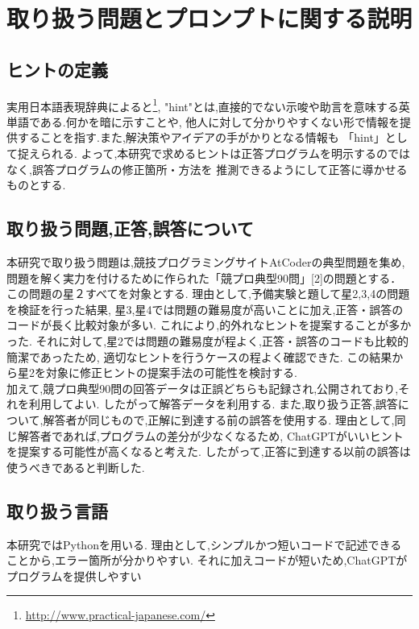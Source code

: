 \chapter{取り扱う問題とプロンプトに関する説明}

\section{ヒントの定義}
実用日本語表現辞典によると\footnote{\url{http://www.practical-japanese.com/}},
"hint"とは,直接的でない示唆や助言を意味する英単語である.何かを暗に示すことや,
他人に対して分かりやすくない形で情報を提供することを指す.また,解決策やアイデアの手がかりとなる情報も
「hint」として捉えられる.
よって,本研究で求めるヒントは正答プログラムを明示するのではなく,誤答プログラムの修正箇所・方法を
推測できるようにして正答に導かせるものとする.


\section{取り扱う問題,正答,誤答について}
本研究で取り扱う問題は,競技プログラミングサイトAtCoderの典型問題を集め,
問題を解く実力を付けるために作られた「競プロ典型90問」[2]の問題とする．
この問題の星２すべてを対象とする.
理由として,予備実験と題して星2,3,4の問題を検証を行った結果,
星3,星4では問題の難易度が高いことに加え,正答・誤答のコードが長く比較対象が多い.
これにより,的外れなヒントを提案することが多かった.
それに対して,星2では問題の難易度が程よく,正答・誤答のコードも比較的簡潔であったため,
適切なヒントを行うケースの程よく確認できた.
この結果から星2を対象に修正ヒントの提案手法の可能性を検討する.\\
加えて,競プロ典型90問の回答データは正誤どちらも記録され,公開されており,それを利用してよい.
したがって解答データを利用する.
また,取り扱う正答,誤答について,解答者が同じもので,正解に到達する前の誤答を使用する.
理由として,同じ解答者であれば,プログラムの差分が少なくなるため,
ChatGPTがいいヒントを提案する可能性が高くなると考えた.
したがって,正答に到達する以前の誤答は使うべきであると判断した.


\section{取り扱う言語}
本研究ではPythonを用いる.
理由として,シンプルかつ短いコードで記述できることから,エラー箇所が分かりやすい.
それに加えコードが短いため,ChatGPTがプログラムを提供しやすい

